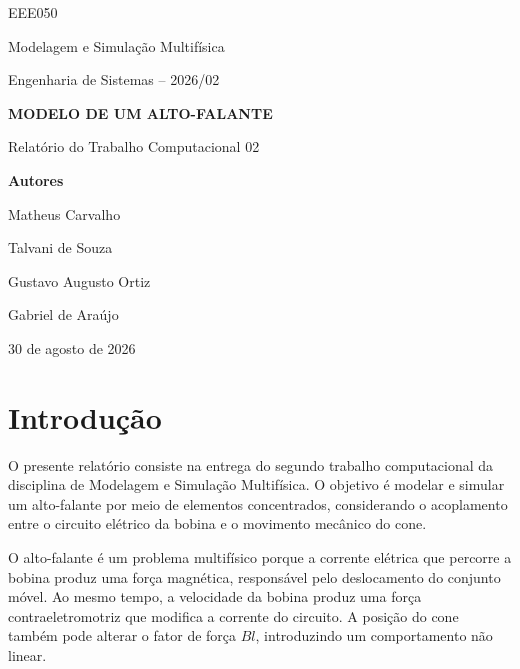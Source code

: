 \documentclass[12pt,letterpaper]{article}
\begin{document}
\begin{titlepage}
    \centering
    {\Large EEE050\par}
    \vspace{0.4cm}
    {\Large Modelagem e Simulação Multifísica\par}
    \vspace{0.2cm}
    {\large Engenharia de Sistemas -- 2026/02\par}

    \vfill

    {\LARGE\bfseries MODELO DE UM ALTO-FALANTE\par}
    \vspace{0.4cm}
    {\Large Relatório do Trabalho Computacional 02\par}

    \vfill

    {\large\bfseries Autores\par}
    \vspace{0.5cm}
    {\large
    Matheus Carvalho\par
    Talvani de Souza\par
    Gustavo Augusto Ortiz\par
    Gabriel de Araújo\par}

    \vfill

    {\large 30 de agosto de 2026\par}
\end{titlepage}

\tableofcontents
\newpage

\section{Introdução}

O presente relatório consiste na entrega do segundo trabalho computacional da
disciplina de Modelagem e Simulação Multifísica. O objetivo é modelar e simular
um alto-falante por meio de elementos concentrados, considerando o acoplamento
entre o circuito elétrico da bobina e o movimento mecânico do cone.

O alto-falante é um problema multifísico porque a corrente elétrica que percorre
a bobina produz uma força magnética, responsável pelo deslocamento do conjunto
móvel. Ao mesmo tempo, a velocidade da bobina produz uma força
contraeletromotriz que modifica a corrente do circuito. A posição do cone também
pode alterar o fator de força $Bl$, introduzindo um comportamento não linear.
\end{document}
